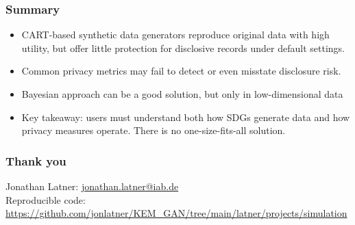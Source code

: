 \documentclass[t,8pt,utfx8]{beamer}
\begin{document}
\begin{spacing}{1.25}
\begin{frame}[t]\frametitle{Summary}

\begin{itemize}
    \item CART-based synthetic data generators reproduce original data with high utility, but offer little protection for disclosive records under default settings.  
    \item Common privacy metrics may fail to detect or even misstate disclosure risk.  
    \item Bayesian approach can be a good solution, but only in low-dimensional data
    \item Key takeaway: users must understand both how SDGs generate data and how privacy measures operate.  There is no one-size-fits-all solution.  
\end{itemize}

\end{frame}

\begin{frame}[t]\frametitle{Thank you}

Jonathan Latner: \url{jonathan.latner@iab.de} \\

Reproducible code: \url{https://github.com/jonlatner/KEM\_GAN/tree/main/latner/projects/simulation} 


\end{frame}

\end{spacing}
\end{document}
